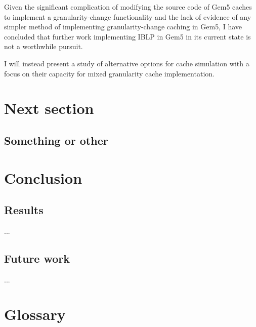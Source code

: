 \documentclass[12pt,twoside]{reedthesis}
\begin{document}
	Given the significant complication of modifying the source code of Gem5 caches to implement a granularity-change functionality and the lack of evidence of any simpler method of implementing granularity-change caching in Gem5, I have concluded that further work implementing IBLP in Gem5 in its current state is not a worthwhile pursuit.

	I will instead present a study of alternative options for cache simulation with a focus on their capacity for mixed granularity cache implementation.


\chapter{Next section}

\section{Something or other}

\chapter{Conclusion}

\section{Results}

...

\section{Future work}

...

\appendix
\chapter{Glossary}
\end{document}
